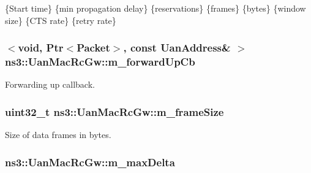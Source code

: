\{Start time\} \{min propagation delay\} \{reservations\} \{frames\} \{bytes\} \{window size\} \{C\+TS rate\} \{retry rate\} 
\subsubsection[{\texorpdfstring{m\+\_\+forward\+Up\+Cb}{m_forwardUpCb}}]{$<$void, {\bf Ptr}$<${\bf Packet}$>$, const {\bf Uan\+Address}\& $>$ ns3\+::\+Uan\+Mac\+Rc\+Gw\+::m\+\_\+forward\+Up\+Cb\hspace{0.3cm}{\ttfamily [private]}}\hypertarget{classns3_1_1UanMacRcGw_ac387b855682d24b25bd9fc21c5c9645c}{}\label{classns3_1_1UanMacRcGw_ac387b855682d24b25bd9fc21c5c9645c}
Forwarding up callback. 
\subsubsection[{\texorpdfstring{m\+\_\+frame\+Size}{m_frameSize}}]{\setlength{\rightskip}{0pt plus 5cm}uint32\+\_\+t ns3\+::\+Uan\+Mac\+Rc\+Gw\+::m\+\_\+frame\+Size\hspace{0.3cm}{\ttfamily [private]}}\hypertarget{classns3_1_1UanMacRcGw_a7cb11b74720c0aa781dea646ac940ac4}{}\label{classns3_1_1UanMacRcGw_a7cb11b74720c0aa781dea646ac940ac4}


Size of data frames in bytes. 

\subsubsection[{\texorpdfstring{m\+\_\+max\+Delta}{m_maxDelta}}]{ ns3\+::\+Uan\+Mac\+Rc\+Gw\+::m\+\_\+max\+Delta\hspace{0.3cm}{\ttfamily [private]}}\hypertarget{classns3_1_1UanMacRcGw_a5134119f83113902bc01101e46d66542}{}\label{classns3_1_1UanMacRcGw_a5134119f83113902bc01101e46d66542}


